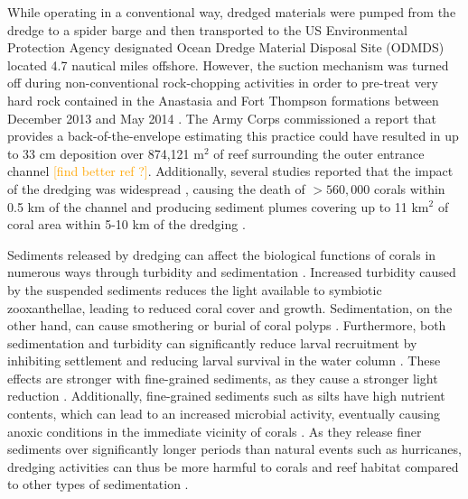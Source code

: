\documentclass[preprint,12pt,authoryear]{elsarticle}
\newcommand{\comment}[1]{\textcolor{orange}{#1}}
\begin{document}
While operating in a conventional way, dredged materials were pumped from the dredge to a spider barge and then transported to the US Environmental Protection Agency designated Ocean Dredge Material Disposal Site (ODMDS) located 4.7 nautical miles offshore. However, the suction mechanism was turned off during non-conventional rock-chopping activities in order to pre-treat very hard rock contained in the Anastasia and Fort Thompson formations between December 2013 and May 2014 \citep{miller2016detecting}. The Army Corps commissioned a report that provides a back-of-the-envelope estimating this practice could have resulted in up to 33 cm deposition over 874,121 m$^2$ of reef surrounding the outer entrance channel \citep{dobbelaere2020report} \comment{[find better ref ?]}. Additionally, several studies reported that the impact of the dredging was widespread \citep{miller2016detecting}, causing the death of  $> 560,000$ corals within 0.5 km of the channel \citep{cunning2019extensive} and producing sediment plumes covering up to 11 km$^2$ of coral area within 5-10 km of the dredging \citep{barnes2015sediment}.

Sediments released by dredging can affect the biological functions of corals in numerous ways  through turbidity and sedimentation \citep{erftemeijer2012environmental, jones2015effects}. Increased turbidity caused by the suspended sediments reduces the light available to symbiotic zooxanthellae, leading to reduced coral cover and growth. Sedimentation, on the other hand, can cause smothering or burial of coral polyps \citep{erftemeijer2012environmental}. Furthermore, both sedimentation and turbidity can significantly reduce larval recruitment by inhibiting settlement and reducing larval survival in the water column \citep{jones2015effects}. These effects are stronger with fine-grained sediments, as they cause a stronger light reduction \citep{fourney2017additive}. Additionally, fine-grained sediments such as silts have high nutrient contents, which can lead to an increased microbial activity, eventually causing anoxic conditions in the immediate vicinity of corals \citep{weber2012mechanisms}. As they release finer sediments over significantly longer periods than natural events such as hurricanes, dredging activities can thus be more harmful to corals and reef habitat compared to other types of sedimentation \citep{cunning2019extensive}.
\end{document}
